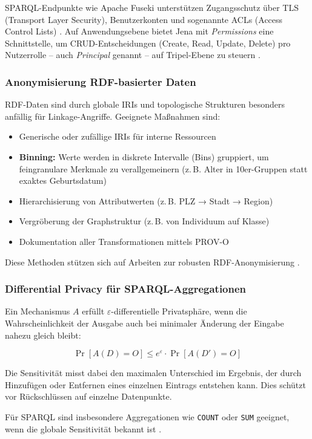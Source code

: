 SPARQL-Endpunkte wie Apache Fuseki unterstützen Zugangsschutz über TLS (Transport Layer Security), Benutzerkonten und sogenannte ACLs (Access Control Lists) \cite{FusekiAccess}. Auf Anwendungsebene bietet Jena mit \emph{Permissions} eine Schnittstelle, um CRUD-Entscheidungen (Create, Read, Update, Delete) pro Nutzerrolle – auch \emph{Principal} genannt – auf Tripel-Ebene zu steuern \cite{JenaPermissions}.

\subsubsection{Anonymisierung RDF-basierter Daten}

RDF-Daten sind durch globale IRIs und topologische Strukturen besonders anfällig für Linkage-Angriffe. Geeignete Maßnahmen sind:
\begin{itemize}
\item Generische oder zufällige IRIs für interne Ressourcen
\item \textbf{Binning:} Werte werden in diskrete Intervalle (Bins) gruppiert, um feingranulare Merkmale zu verallgemeinern (z.\,B. Alter in 10er-Gruppen statt exaktes Geburtsdatum)
\item Hierarchisierung von Attributwerten (z.\,B. PLZ → Stadt → Region)
\item Vergröberung der Graphstruktur (z.\,B. von Individuum auf Klasse)
\item Dokumentation aller Transformationen mittels PROV-O
\end{itemize}
Diese Methoden stützen sich auf Arbeiten zur robusten RDF-Anonymisierung \cite{delanaux-linkage, logical-foundations-lda}.

\subsubsection{Differential Privacy für SPARQL-Aggregationen}

Ein Mechanismus $A$ erfüllt $\varepsilon$-differentielle Privatsphäre, wenn die Wahrscheinlichkeit der Ausgabe auch bei minimaler Änderung der Eingabe nahezu gleich bleibt:

\[
\Pr[A(D) = O] \leq e^{\varepsilon} \cdot \Pr[A(D') = O]
\]

Die Sensitivität misst dabei den maximalen Unterschied im Ergebnis, der durch Hinzufügen oder Entfernen eines einzelnen Eintrags entstehen kann. Dies schützt vor Rückschlüssen auf einzelne Datenpunkte.

Für SPARQL sind insbesondere Aggregationen wie \texttt{COUNT} oder \texttt{SUM} geeignet, wenn die globale Sensitivität bekannt ist \cite{builaranda-dp-sparql}.

